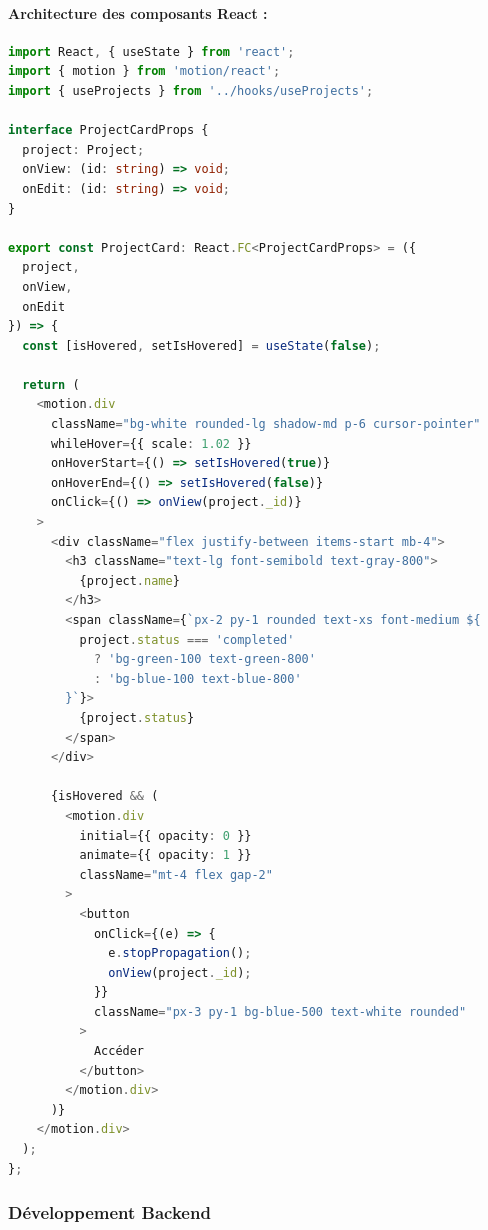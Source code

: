 \paragraph{Architecture des composants React :}
\begin{lstlisting}[language=TypeScript, caption={Exemple de composant React}]
import React, { useState } from 'react';
import { motion } from 'motion/react';
import { useProjects } from '../hooks/useProjects';

interface ProjectCardProps {
  project: Project;
  onView: (id: string) => void;
  onEdit: (id: string) => void;
}

export const ProjectCard: React.FC<ProjectCardProps> = ({ 
  project, 
  onView, 
  onEdit 
}) => {
  const [isHovered, setIsHovered] = useState(false);
  
  return (
    <motion.div
      className="bg-white rounded-lg shadow-md p-6 cursor-pointer"
      whileHover={{ scale: 1.02 }}
      onHoverStart={() => setIsHovered(true)}
      onHoverEnd={() => setIsHovered(false)}
      onClick={() => onView(project._id)}
    >
      <div className="flex justify-between items-start mb-4">
        <h3 className="text-lg font-semibold text-gray-800">
          {project.name}
        </h3>
        <span className={`px-2 py-1 rounded text-xs font-medium ${
          project.status === 'completed' 
            ? 'bg-green-100 text-green-800'
            : 'bg-blue-100 text-blue-800'
        }`}>
          {project.status}
        </span>
      </div>
      
      {isHovered && (
        <motion.div
          initial={{ opacity: 0 }}
          animate={{ opacity: 1 }}
          className="mt-4 flex gap-2"
        >
          <button
            onClick={(e) => {
              e.stopPropagation();
              onView(project._id);
            }}
            className="px-3 py-1 bg-blue-500 text-white rounded"
          >
            Accéder
          </button>
        </motion.div>
      )}
    </motion.div>
  );
};
\end{lstlisting}

\subsubsection{Développement Backend}

